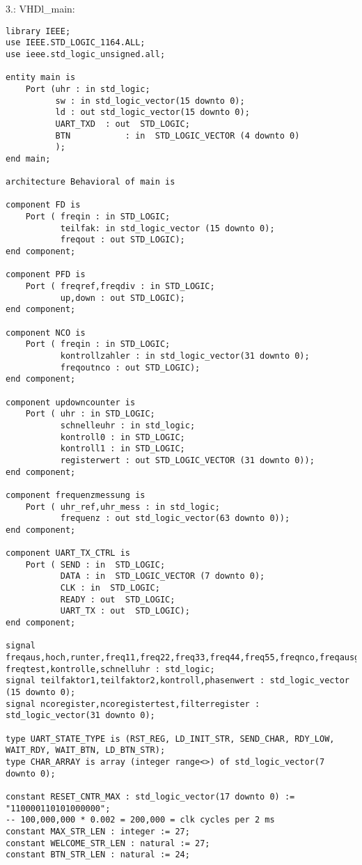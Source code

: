 \documentclass{article}
\begin{document}
3.:\newline
VHDl\_main:\newline
\begin{verbatim}
library IEEE;
use IEEE.STD_LOGIC_1164.ALL;
use ieee.std_logic_unsigned.all;

entity main is
    Port (uhr : in std_logic;
          sw : in std_logic_vector(15 downto 0);
          ld : out std_logic_vector(15 downto 0);
          UART_TXD 	: out  STD_LOGIC;
          BTN 			: in  STD_LOGIC_VECTOR (4 downto 0)
          );
end main;

architecture Behavioral of main is

component FD is
    Port ( freqin : in STD_LOGIC;
           teilfak: in std_logic_vector (15 downto 0);
           freqout : out STD_LOGIC);
end component;

component PFD is
    Port ( freqref,freqdiv : in STD_LOGIC;
           up,down : out STD_LOGIC);
end component;

component NCO is
    Port ( freqin : in STD_LOGIC;
           kontrollzahler : in std_logic_vector(31 downto 0);
           freqoutnco : out STD_LOGIC);
end component;

component updowncounter is
    Port ( uhr : in STD_LOGIC;
           schnelleuhr : in std_logic;
           kontroll0 : in STD_LOGIC;
           kontroll1 : in STD_LOGIC;
           registerwert : out STD_LOGIC_VECTOR (31 downto 0));
end component;

component frequenzmessung is
    Port ( uhr_ref,uhr_mess : in std_logic;
           frequenz : out std_logic_vector(63 downto 0));
end component;

component UART_TX_CTRL is
    Port ( SEND : in  STD_LOGIC;
           DATA : in  STD_LOGIC_VECTOR (7 downto 0);
           CLK : in  STD_LOGIC;
           READY : out  STD_LOGIC;
           UART_TX : out  STD_LOGIC);
end component;

signal freqaus,hoch,runter,freq11,freq22,freq33,freq44,freq55,freqnco,freqausgang,
freqtest,kontrolle,schnelluhr : std_logic;
signal teilfaktor1,teilfaktor2,kontroll,phasenwert : std_logic_vector (15 downto 0);
signal ncoregister,ncoregistertest,filterregister : std_logic_vector(31 downto 0);

type UART_STATE_TYPE is (RST_REG, LD_INIT_STR, SEND_CHAR, RDY_LOW, WAIT_RDY, WAIT_BTN, LD_BTN_STR);
type CHAR_ARRAY is array (integer range<>) of std_logic_vector(7 downto 0);

constant RESET_CNTR_MAX : std_logic_vector(17 downto 0) := "110000110101000000";
-- 100,000,000 * 0.002 = 200,000 = clk cycles per 2 ms
constant MAX_STR_LEN : integer := 27;
constant WELCOME_STR_LEN : natural := 27;
constant BTN_STR_LEN : natural := 24;


\end{verbatim}
\end{document}
